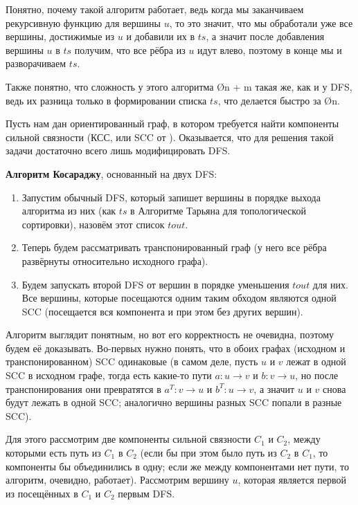 Понятно, почему такой алгоритм работает, ведь когда мы заканчиваем рекурсивную функцию для вершины $u$, то это значит, что мы обработали уже все вершины, достижимые из $u$ и добавили их в $ts$, а значит после добавления вершины $u$ в $ts$ получим, что все рёбра из $u$ идут влево, поэтому в конце мы и разворачиваем $ts$.

Также понятно, что сложность у этого алгоритма \O{n + m} такая же, как и у DFS, ведь их разница только в формировании списка $ts$, что делается быстро за \O{n}.


Пусть нам дан ориентированный граф, в котором требуется найти компоненты сильной связности (КСС, или SCC от ). Оказывается, что для решения такой задачи достаточно всего лишь модифицировать DFS.

\textbf{Алгоритм Косараджу}, основанный на двух DFS:

\begin{enumerate}
    \item Запустим обычный DFS, который запишет вершины в порядке выхода алгоритма из них (как $ts$ в Алгоритме Тарьяна для топологической сортировки), назовём этот список $tout$.
    \item Теперь будем рассматривать транспонированный граф (у него все рёбра развёрнуты относительно исходного графа).
    \item Будем запускать второй DFS от вершин в порядке уменьшения $tout$ для них. Все вершины, которые посещаются одним таким обходом являются одной SCC (посещается вся компонента и при этом без других вершин).
\end{enumerate}

Алгоритм выглядит понятным, но вот его корректность не очевидна, поэтому будем её доказывать. Во-первых нужно понять, что в обоих графах (исходном и транспонированном) SCC одинаковые (в самом деле, пусть $u$ и $v$ лежат в одной SCC в исходном графе, тогда есть какие-то пути $a: u \to v$ и $b: v \to u$, но после транспонирования они превратятся в $a^T: v \to u$ и $b^T: u \to v$, а значит $u$ и $v$ снова будут лежать в одной SCC; аналогично вершины разных SCC попали в разные SCC).

Для этого рассмотрим две компоненты сильной связности $C_1$ и $C_2$, между которыми есть путь из $C_1$ в $C_2$ (если бы при этом было путь из $C_2$ в $C_1$, то компоненты бы объединились в одну; если же между компонентами нет пути, то алгоритм, очевидно, работает). Рассмотрим вершину $u$, которая является первой из посещённых в $C_1$ и $C_2$ первым DFS.

